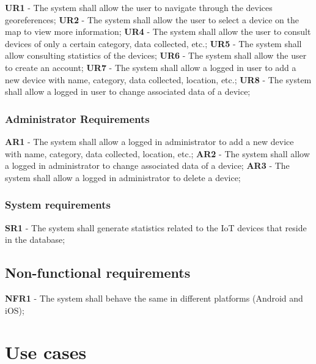 \documentclass{scrreprt}
\begin{document}
\textbf{UR1} - The system shall allow the user to navigate through the devices georeferences;
\newline
\textbf{UR2} - The system shall allow the user to select a device on the map to view more information;
\newline
\textbf{UR4} - The system shall allow the user to consult devices of only a certain category, data collected, etc.;
\newline
\textbf{UR5} - The system shall allow consulting statistics of the devices;
\newline
\textbf{UR6} - The system shall allow the user to create an account;
\newline
\textbf{UR7} - The system shall allow a logged in user to add a new device with name, category, data collected, location, etc.;
\newline
\textbf{UR8} - The system shall allow a logged in user to change associated data of a device;

\subsection{Administrator Requirements}

\textbf{AR1} - The system shall allow a logged in administrator to add a new device with name, category, data collected, location, etc.;
\newline
\textbf{AR2} - The system shall allow a logged in administrator to change associated data of a device;
\newline
\textbf{AR3} - The system shall allow a logged in administrator to delete a device;

\subsection{System requirements}

\textbf{SR1} - The system shall generate statistics related to the IoT devices that reside in the database;

\section{Non-functional requirements}

\textbf{NFR1} - The system shall behave the same in different platforms (Android and iOS);

\chapter{Use cases}
\end{document}
